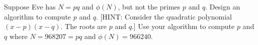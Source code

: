   Suppose Eve has $N = pq$ and $\phi(N)$, but
  not the primes $p$ and $q$.
  Design an algorithm to compute $p$ and $q$.
  [HINT: Consider the quadratic polynomial
  $(x - p)(x - q)$. The roots are $p$ and $q$.]
  Use your algorithm to compute
  $p$ and $q$ where
  $N = 968207 = pq$ and $\phi(N) = 966240$. 
